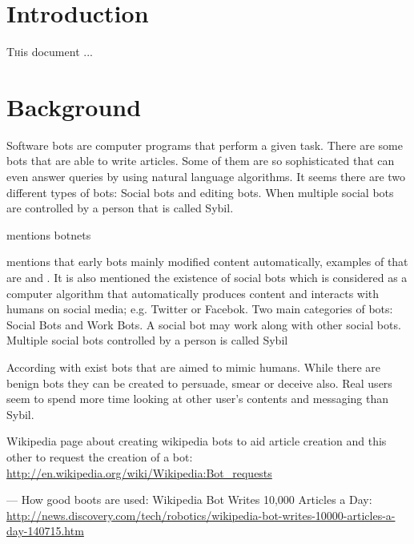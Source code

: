 \documentclass[twoside]{article}
\begin{document}
\begin{multicols}{2} %

\section{Introduction}
\lettrine[nindent=0em,lines=3]{T}his document ...


\section{Background}
Software bots are computer programs that perform a given task. There are some bots that are able to write articles\cite{guld:2013}. 
Some of them are so sophisticated that can even answer queries by using natural language algorithms\cite{emerging:2014}. It seems
there are two different types of bots: Social bots and editing bots. When multiple social bots are controlled by a person that is called
Sybil\cite{ferrara:2015}.

\cite{kuhn:2015} mentions botnets 

\cite{ferrara:2015} mentions that early bots mainly modified content automatically, examples of that are \cite{wikiWriter:2014} and \cite{wikiList:2014}. It is also mentioned the existence of social bots which is considered as a computer algorithm that automatically produces content and interacts with humans on social media; e.g. Twitter or Facebok.
Two main categories of bots: Social Bots and Work Bots. A social bot may work along with other social bots. Multiple social bots controlled by a person is called Sybil\cite{ferrara:2015}

According with \cite{ferrara:2015} exist bots that are aimed to mimic humans. While there are benign bots they can be created to persuade, smear or deceive also. 
Real users seem to spend more time looking at other user's contents and messaging than Sybil.

Wikipedia page about creating wikipedia bots to aid article creation\cite{wtalk:2014} and this other to request the creation of a bot: \url{http://en.wikipedia.org/wiki/Wikipedia:Bot_requests}

---
How good boots are used: Wikipedia Bot Writes 10,000 Articles a Day: \url{http://news.discovery.com/tech/robotics/wikipedia-bot-writes-10000-articles-a-day-140715.htm}


\end{multicols}
\end{document}
